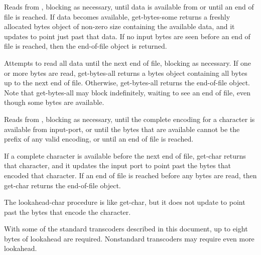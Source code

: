 \begin{entry}{%
}
   
Reads from , blocking as necessary, until data is
available from  or until an end of file is reached.  If data
becomes available, {\cf get-bytes-some} returns a freshly allocated bytes object of
non-zero size containing the available data, and it updates  to
point just past that data.  If no input bytes are seen before an end
of file is reached, then the end-of-file object is returned.
\end{entry}

\begin{entry}{%
}
   
Attempts to read all data until the next end of file, blocking as
necessary. If one or more bytes are read, {\cf get-bytes-all} returns a bytes object
containing all bytes up to the next end of file.  Otherwise, {\cf
  get-bytes-all} returns the end-of-file object. Note that  {\cf get-bytes-all}
may block indefinitely, waiting to see an end of
file, even though some bytes are available.
\end{entry}

\begin{entry}{%
}
   
Reads from , blocking as necessary, until the
complete encoding for a character is available from input-port, or until
the bytes that are available cannot be the prefix of any valid encoding,
or until an end of file is reached.

If a complete character is available before the next end of file, {\cf
  get-char} returns that character, and it updates the input port to
point past the bytes that encoded that character. If an end of file is
reached before any bytes are read, then {\cf get-char} returns the
end-of-file object.
\end{entry}

\begin{entry}{%
}
  
The {\cf lookahead-char} procedure is like {\cf get-char}, but it does not 
update  to point past the bytes that encode the character.

\begin{note}
  With some of the standard transcoders
  described in this document, up to eight bytes of lookahead are
  required. Nonstandard transcoders may require even more lookahead.
\end{note}
\end{entry}

